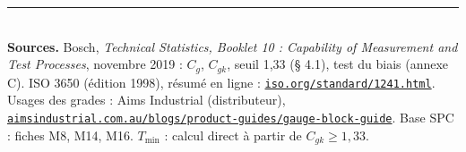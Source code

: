 \documentclass[10pt,a4paper]{article}
\begin{document}
\vspace{2pt}
{\scriptsize\color{uimm}\rule{\linewidth}{0.4pt}\\
\textbf{Sources.} Bosch, \emph{Technical Statistics, Booklet 10 : Capability of Measurement and Test Processes}, novembre 2019 : $C_g$, $C_{gk}$, seuil 1,33 (§ 4.1), test du biais (annexe C). ISO 3650 (édition 1998), résumé en ligne : \href{https://www.iso.org/standard/1241.html}{\nolinkurl{iso.org/standard/1241.html}}. Usages des grades : Aims Industrial (distributeur), \href{https://aimsindustrial.com.au/blogs/product-guides/gauge-block-guide}{\nolinkurl{aimsindustrial.com.au/blogs/product-guides/gauge-block-guide}}. Base SPC : fiches M8, M14, M16. $T_{\min}$ : calcul direct à partir de $C_{gk}\ge1{,}33$.}
\end{document}
